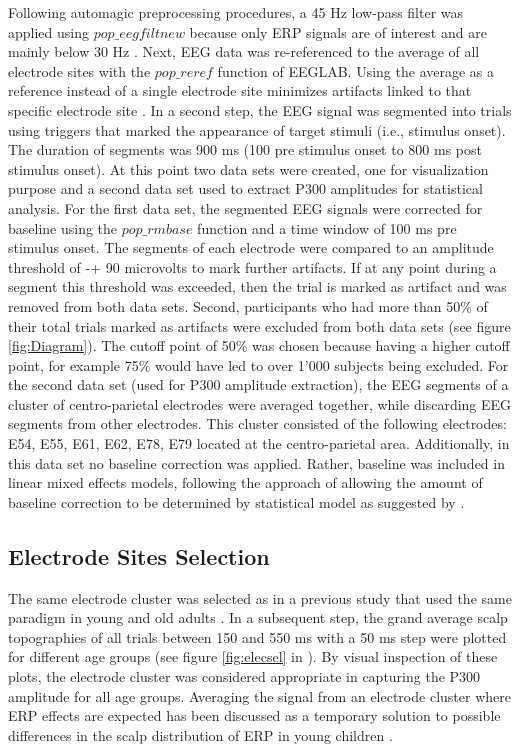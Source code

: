 Following automagic preprocessing procedures, a 45 Hz low-pass filter was applied using $pop\_eegfiltnew$ because only ERP signals are of interest and are mainly below 30 Hz \parencite{luckIntroductionEventrelatedPotential2014}. Next, EEG data was re-referenced to the average of all electrode sites with the $pop\_reref$ function of EEGLAB. Using the average as a reference instead of a single electrode site minimizes artifacts linked to that specific electrode site \parencite{dienIssuesApplicationAverage1998}.
In a second step, the EEG signal was segmented into trials using triggers that marked the appearance of target stimuli (i.e., stimulus onset). The duration of segments was 900 ms (100 pre stimulus onset to 800 ms post stimulus onset). 
At this point two data sets were created, one for visualization purpose and a second data set used to extract P300 amplitudes for statistical analysis. For the first data set, the segmented EEG signals were corrected for baseline using the $pop\_rmbase$ function and a time window of 100 ms pre stimulus onset. The segments of each electrode were compared to an amplitude threshold of -+ 90 microvolts to mark further artifacts. If at any point during a segment this threshold was exceeded, then the trial is marked as artifact and was removed from both data sets. Second, participants who had more than 50\% of their total trials marked as artifacts were excluded from both data sets (see figure \ref{fig:Diagram}). The cutoff point of 50\% was chosen because having a higher cutoff point, for example 75\% would have led to over 1'000 subjects being excluded. 
For the second data set (used for P300 amplitude extraction), the EEG segments of a cluster of centro-parietal electrodes were averaged together, while discarding EEG segments from other electrodes. This cluster consisted of the following electrodes: E54, E55, E61, E62, E78, E79 located at the centro-parietal area. 
Additionally, in this data set no baseline correction was applied. Rather, baseline was included in linear mixed effects models, following the approach of allowing the amount of baseline correction to be determined by statistical model as suggested by \textcite{aldayHowMuchBaseline2019}.


\subsection{Electrode Sites Selection}
The same electrode cluster was selected as in a previous study that used the same paradigm in young and old adults \parencite{strzelczykNeurophysiologicalMarkersSuccessful2022}. In a subsequent step, the grand average scalp topographies of all trials between 150 and 550 ms with a 50 ms step were plotted for different age groups (see figure \ref{fig:elecsel} in ). By visual inspection of these plots, the electrode cluster was considered appropriate in capturing the P300 amplitude for all age groups. Averaging the signal from an electrode cluster where ERP effects are expected has been discussed as a temporary solution to possible differences in the scalp distribution of ERP in young children \parencite{brookerConductingEventRelatedPotential2020}.

